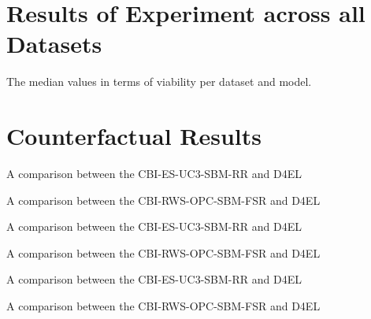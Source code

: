 \documentclass[12pt,a4paper]{report}
\begin{document}
\chapter{Results of Experiment across all Datasets}
\begin{table}
    \centering
    \resizebox{\linewidth}{!}{}
    \caption{The median values in terms of viability per dataset and model.}
    \label{app:exp5-winner-datasets}
\end{table}


\chapter{Counterfactual Results}
\begin{table}
  \centering    
  \resizebox{\linewidth}{!}{
  
  }
  \caption{A comparison between the CBI-ES-UC3-SBM-RR and D4EL}
\end{table}
\begin{table}
  \centering    
  \resizebox{\linewidth}{!}{
  
  
  }
\caption{A comparison between the CBI-RWS-OPC-SBM-FSR and D4EL}
\end{table}
\begin{table}
  \centering    
  \resizebox{\linewidth}{!}{
  
  }
  \caption{A comparison between the CBI-ES-UC3-SBM-RR and D4EL}
\end{table}
\begin{table}
  \centering    
  \resizebox{\linewidth}{!}{
  
  
  }
\caption{A comparison between the CBI-RWS-OPC-SBM-FSR and D4EL}
\end{table}

\begin{table}
  \centering    
  \resizebox{\linewidth}{!}{
  
  }
  \caption{A comparison between the CBI-ES-UC3-SBM-RR and D4EL}
\end{table}
\begin{table}
  \centering    
  \resizebox{\linewidth}{!}{
  
  
  }
\caption{A comparison between the CBI-RWS-OPC-SBM-FSR and D4EL}
\end{table}
\end{document}
